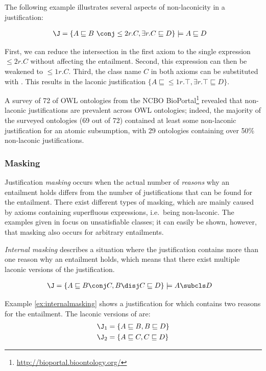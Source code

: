 The following example illustrates several aspects of non-laconicity in a justification:
\begin{examp}
\begin{align*}
\J &=  \{ A \sqsubseteq B ~\conj \leq2 r.C, \exists r.C \sqsubseteq D\} \models A \sqsubseteq D
\end{align*}
\end{examp}
First, we can reduce the intersection in the first axiom to the single expression $\leq2 r.C$ without affecting the entailment. Second, this expression can then be weakened to $\leq1 r.C$. Third, the class name $C$ in both axioms can be substituted with \thing. This results in the laconic justification $\{ A \sqsubseteq \leq1 r.\top, \exists r.\top \sqsubseteq D\}$. 

A survey \cite{horridge11ab} of 72 of OWL ontologies from the NCBO BioPortal\footnote{\url{http://bioportal.bioontology.org/}} revealed that non-laconic justifications are prevalent across OWL ontologies; indeed, the majority of the surveyed ontologies (69 out of 72) contained at least some non-laconic justification for an atomic subsumption, with 29 ontologies containing over 50\% non-laconic justifications. 

\subsubsection{Masking}
Justification \emph{masking} \cite{horridge08yi,horridge10bg} occurs when the actual number of \emph{reasons} why an entailment holds differs from the number of justifications that can be found for the entailment. There exist different types of masking, which are mainly caused by axioms containing superfluous expressions, i.e.\ being non-laconic. The examples given in \cite{horridge10bg} focus on unsatisfiable classes; it can easily be shown, however, that masking also occurs for arbitrary entailments.

\emph{Internal masking} describes a situation where the justification contains more than one reason why an entailment holds, which means that there exist multiple laconic versions of the justification.
\begin{examp}\begin{align*}
\J &=  \{ A \sqsubseteq B \conj C, B \disj C \sqsubseteq D\} \models A \subcls D
\end{align*}\label{ex:internalmasking}\end{examp}
Example \ref{ex:internalmasking} shows a justification \J for  which contains two reasons for the entailment. The laconic versions of \J are:
\begin{align*}\J_{1} &=  \{ A \sqsubseteq B, B \sqsubseteq D\}\\
\J_{2} &=  \{ A \sqsubseteq C, C \sqsubseteq D\}\end{align*}

